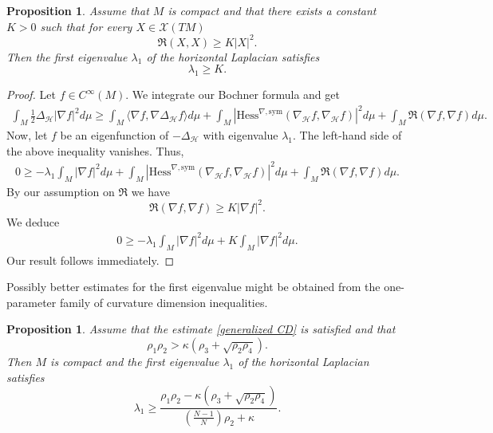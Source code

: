 \documentclass[11pt]{article}
\numberwithin{equation}{section}
\newtheorem{proposition}[theorem]{Proposition}
\newcommand{\Ho}{\mathcal H}
\begin{document}
\begin{proposition}
Assume that $M$ is compact and that there exists a constant $K >0$ such that for every $X \in \mathcal{X}(TM)$
        \[
        \mathfrak{R} (X,X)  \ge K | X|^2.
        \]
    Then the first eigenvalue $\lambda_1$ of the horizontal Laplacian satisfies 
    \[
    \lambda_1 \ge K.
    \]
\end{proposition}
\begin{proof}
		Let $f \in C^\infty(M)$. We integrate our Bochner formula and get
		\begin{align*}
			\int_{M}\frac{1}{2}\Delta_{\mathcal{H}} | \nabla f|^2 d\mu \geq\int_{M}\langle \nabla f , \nabla \Delta_{\mathcal{H}} f \rangle d\mu +\int_{M}| \mathrm{Hess}^{\nabla, \mathrm{sym}} (\nabla_\Ho f ,\nabla_\Ho f)|^2 d\mu +\int_{M}\mathfrak{R} (\nabla f,\nabla f) d\mu .
		\end{align*}
		Now, let $f$ be an eigenfunction of $-\Delta_{\mathcal{H}}$ with eigenvalue $\lambda_1$. The left-hand side of the above inequality vanishes. Thus,
		\begin{align*}
			0\geq-\lambda_1\int_{M}|\nabla f|^2 d\mu+\int_{M}| \mathrm{Hess}^{\nabla, \mathrm{sym}} (\nabla_\Ho f ,\nabla_\Ho f)|^2d\mu+\int_{M}\mathfrak{R} (\nabla f,\nabla f)d\mu.
		\end{align*}
        By our assumption on $\mathfrak{R}$ we have
		\[\mathfrak{R} (\nabla f,\nabla f)\geq K|\nabla f|^2.      \]
        We deduce
        \begin{align*}
            0\geq -\lambda_1 \int_M | \nabla f |^2d\mu+K\int_M | \nabla f |^2d\mu.
        \end{align*}
        Our result follows immediately. 
	\end{proof}

    Possibly better estimates for the first eigenvalue might be obtained  from the one-parameter family of curvature dimension inequalities.

    \begin{proposition}
        Assume that the estimate \eqref{generalized CD} is satisfied and that
        \[
        \rho_1 \rho_2 > \kappa (\rho_3 +\sqrt{\rho_2\rho_4}).
        \]
        Then $M$ is compact and  the first eigenvalue $\lambda_1$ of the horizontal Laplacian satisfies 
    \[
    \lambda_1 \ge \frac{\rho_1 \rho_2 - \kappa (\rho_3 +\sqrt{\rho_2\rho_4})}{\left(\frac{N-1}{N}\right)\rho_2+\kappa }.
    \]
    \end{proposition}
\end{document}
